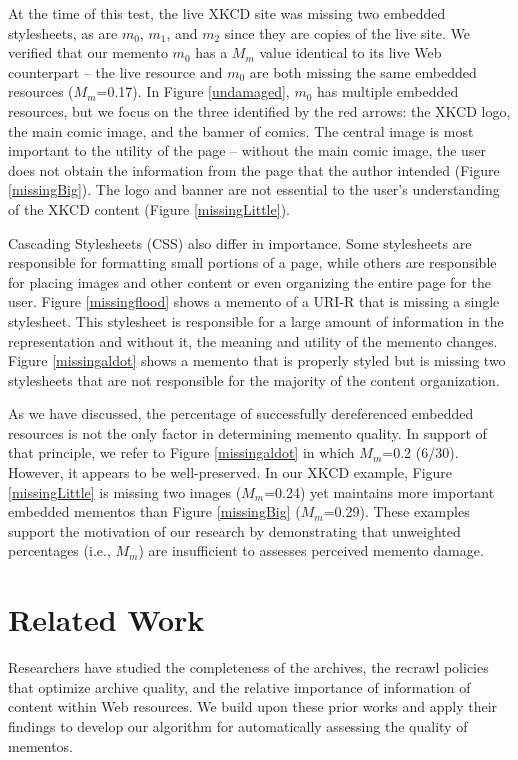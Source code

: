 At the time of this test, the live XKCD site was missing two embedded stylesheets, as are $m_0$, $m_1$, and $m_2$ since they are copies of the live site. We verified that our memento $m_0$ has a $M_m$ value identical to its live Web counterpart -- the live resource and $m_0$ are both missing the same embedded resources ($M_m$=0.17). In Figure \ref{undamaged}, $m_0$ has multiple embedded resources, but we focus on the three identified by the red arrows: the XKCD logo, the main comic image, and the banner of comics. The central image is most important to the utility of the page -- without the main comic image, the user does not obtain the information from the page that the author intended (Figure \ref{missingBig}). The logo and banner are not essential to the user's understanding of the XKCD content (Figure \ref{missingLittle}). 

Cascading Stylesheets (CSS) also differ in importance. Some stylesheets are responsible for formatting small portions of a page, while others are responsible for placing images and other content or even organizing the entire page for the user. Figure \ref{missingflood} shows a memento of a URI-R that is missing a single stylesheet. This stylesheet is responsible for a large amount of information in the representation and without it, the meaning and utility of the memento changes. Figure \ref{missingaldot} shows a memento that is properly styled but is missing two stylesheets that are not responsible for the majority of the content organization.%

As we have discussed, the percentage of successfully dereferenced embedded resources is not the only factor in determining memento quality. In support of that principle, we refer to Figure \ref{missingaldot} in which $M_m$=0.2 (6/30). However, it appears to be well-preserved. In our XKCD example, Figure \ref{missingLittle} is missing two images ($M_m$=0.24) yet maintains more important embedded mementos than Figure \ref{missingBig} ($M_m$=0.29). These examples support the motivation of our research by demonstrating that unweighted percentages (i.e., $M_m$) are insufficient to assesses perceived memento damage.


\section{Related Work}
\label{priorwork}
Researchers have studied the completeness of the archives, the recrawl policies that optimize archive quality, and the relative importance of information of content within Web resources. We build upon these prior works and apply their findings to develop our algorithm for automatically assessing the quality of mementos.

